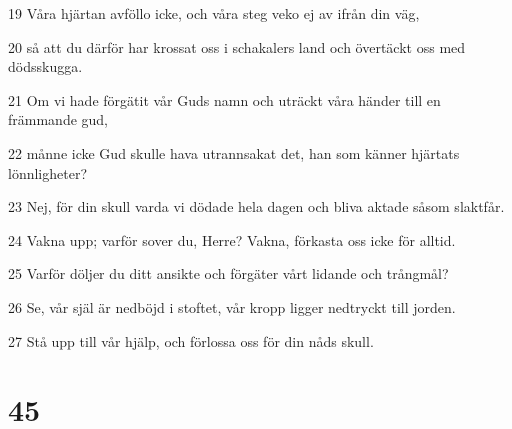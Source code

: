 \par 19 Våra hjärtan avföllo icke, och våra steg veko ej av ifrån din väg,
\par 20 så att du därför har krossat oss i schakalers land och övertäckt oss med dödsskugga.
\par 21 Om vi hade förgätit vår Guds namn och uträckt våra händer till en främmande gud,
\par 22 månne icke Gud skulle hava utrannsakat det, han som känner hjärtats lönnligheter?
\par 23 Nej, för din skull varda vi dödade hela dagen och bliva aktade såsom slaktfår.
\par 24 Vakna upp; varför sover du, Herre? Vakna, förkasta oss icke för alltid.
\par 25 Varför döljer du ditt ansikte och förgäter vårt lidande och trångmål?
\par 26 Se, vår själ är nedböjd i stoftet, vår kropp ligger nedtryckt till jorden.
\par 27 Stå upp till vår hjälp, och förlossa oss för din nåds skull.

\chapter{45}

